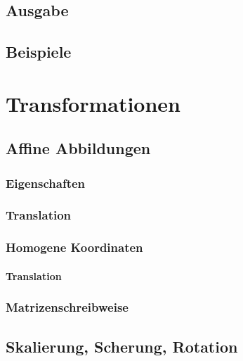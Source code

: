 \documentclass[a4paper, 11pt, accentcolor = tud3b]{tudreport}
\begin{document}
		\section{Ausgabe} %

		\section{Beispiele} %

	\chapter{Transformationen} %

		\section{Affine Abbildungen} %

			\subsection{Eigenschaften} %

			\subsection{Translation} %

			\subsection{Homogene Koordinaten} %

				\subsubsection{Translation} %

			\subsection{Matrizenschreibweise} %

		\section{Skalierung, Scherung, Rotation} %
\end{document}
